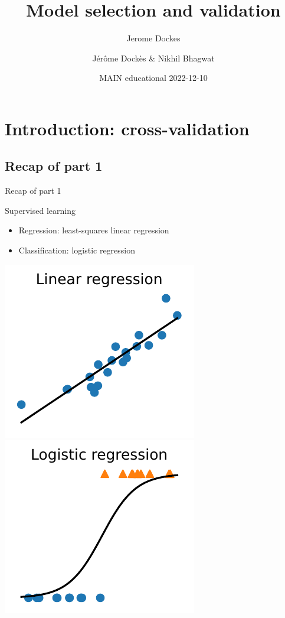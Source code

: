\documentclass[presentation,mathserif,table]{beamer}
\author{Jerome Dockes}
\date{}
\title{Model selection and validation}
\author{Jérôme Dockès \& Nikhil Bhagwat}
\date{MAIN educational 2022-12-10}
\begin{document}
\maketitle
\section{Introduction: cross-validation}
\label{sec:orgc4ccea4}
\subsection{Recap of part 1}
\label{sec:org9a0179e}
\begin{frame}[label={sec:org95e38d3}]{Recap of part 1}
\begin{block}{Supervised learning}
\begin{itemize}
\item Regression: least-squares linear regression
\item Classification: logistic regression
\end{itemize}
\includegraphics[height=.4 \textheight]{figures/generated/linear_regression_1d/linear_regression.pdf}
\includegraphics[height=.4 \textheight]{figures/generated/logistic_regression_1d/logistic_regression.pdf}
\end{block}
\end{frame}
\end{document}
